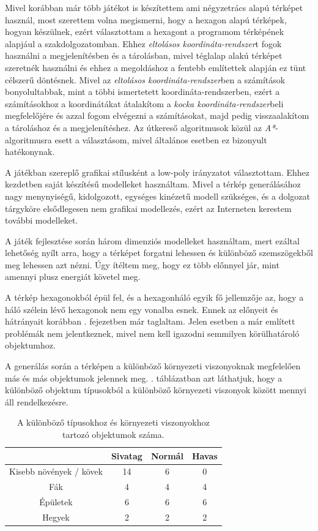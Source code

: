 \label{chap:tervezes}

Mivel korábban már több játékot is készítettem ami négyzetrács alapú térképet használ, most szerettem volna megismerni, hogy a hexagon alapú térképek, hogyan készülnek, ezért választottam a hexagont a programom térképének alapjául a szakdolgozatomban. Ehhez \textit{eltolásos koordináta-rendszer}t fogok használni a megjelenítésben és a tárolásban, mivel téglalap alakú térképet szeretnék használni és ehhez a megoldáshoz a fentebb említettek alapján ez tünt célszerű döntésnek. Mivel az \textit{eltolásos koordináta-rendszer}ben a számítások bonyolultabbak, mint a többi ismertetett koordináta-rendszerben, ezért a számításokhoz a koordinátákat átalakítom a \textit{kocka koordináta-rendszer}beli megfelelőjére és azzal fogom elvégezni a számításokat, majd pedig visszaalakítom a tároláshoz és a megjelenítéshez. Az útkereső algoritmusok közül az \textit{A*}-algoritmusra esett a választásom, mivel általános esetben ez bizonyult hatékonynak.


A játékban szereplő grafikai stílusként a low-poly irányzatot választottam. Ehhez kezdetben saját készítésű modelleket használtam. Mivel a térkép generálásához nagy meny\-nyi\-sé\-gű, kidolgozott, egységes kinézetű modell szükséges, és a dolgozat tárgyköre elsődlegesen nem grafikai modellezés, ezért az Interneten kerestem további modelleket.

A játék fejlesztése során három dimenziós modelleket használtam, mert ezáltal lehetőség nyílt arra, hogy a térképet forgatni lehessen és különböző szemszögekből meg lehessen azt nézni. Úgy ítéltem meg, hogy ez több előnnyel jár, mint amennyi plusz energiát követel meg.

A térkép hexagonokból épül fel, és a hexagonháló egyik fő jellemzője az, hogy a háló szélein lévő hexagonok nem egy vonalba esnek. Ennek az előnyeit és hátrányait korábban . fejezetben már taglaltam. Jelen esetben a már említett problémák nem jelentkeznek, mivel nem kell igazodni semmilyen körülhatároló objektumhoz.

A generálás során a térképen a különböző környezeti viszonyoknak megfelelően más és más objektumok jelennek meg. . táblázatban azt láthatjuk, hogy a különböző objektum típusokból a különböző környezeti viszonyok között mennyi áll rendelkezésre.

\begin{table}[h!]
  \centering
  \begin{tabular}{ | c | c | c | c | }
    \hline
     & Sivatag & Normál & Havas \\ \hline
    Kisebb növények / kövek & 14 & 6 & 0 \\ \hline
    Fák & 4 & 4 & 4 \\ \hline
    Épületek & 6 & 6 & 6 \\ \hline
    Hegyek & 2 & 2 & 2 \\ \hline
  \end{tabular}
  \caption{A különböző típusokhoz és környezeti viszonyokhoz tartozó objektumok száma.}
  \label{tab:models}
\end{table}
 \newpage
{}

